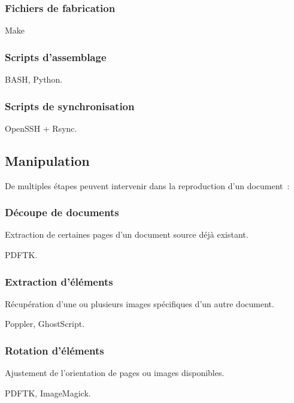 \subsubsection{Fichiers de fabrication}

Make

\subsubsection{Scripts d’assemblage}

BASH, Python.

\subsubsection{Scripts de synchronisation}

OpenSSH + Rsync.

\hr

\subsection{Manipulation}

De multiples étapes peuvent intervenir dans la reproduction d’un document :

\subsubsection{Découpe de documents}

Extraction de certaines pages d’un document source déjà existant.

PDFTK.

\subsubsection{Extraction d’éléments}

Récupération d’une ou plusieurs images spécifiques d’un autre document.

Poppler, GhostScript.

\subsubsection{Rotation d’éléments}

Ajustement de l’orientation de pages ou images disponibles.

PDFTK, ImageMagick.

